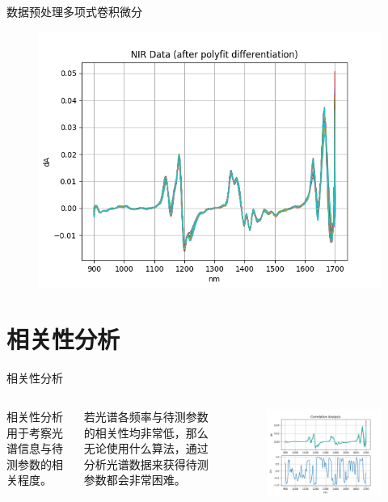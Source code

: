\documentclass[11pt]{beamer}
\begin{document}
	\begin{frame}{数据预处理}{多项式卷积微分}
		\begin{figure}
			\centering
			\includegraphics[height=0.7\textheight]{../img/diff}
		\end{figure}
	\end{frame}
	\section{相关性分析}
	\begin{frame}{相关性分析}
		\begin{columns}
			相关性分析用于考察光谱信息与待测参数的相关程度。
			
			\bigskip 若光谱各频率与待测参数的相关性均非常低，那么无论使用什么算法，通过分析光谱数据来获得待测参数都会非常困难。
			\begin{figure}
				\centering
				\includegraphics[width=\linewidth]{../img/correlation}
			\end{figure}
		\end{columns}
	\end{frame}
			
\end{document}
